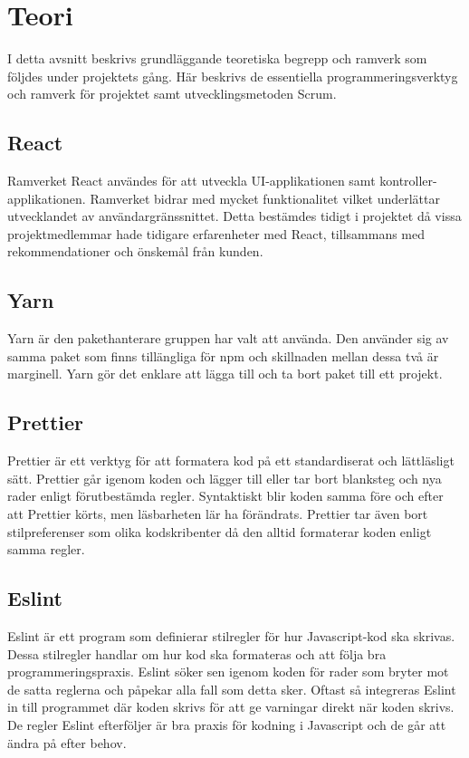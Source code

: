 \chapter{Teori}
\label{cha:theory}
I detta avsnitt beskrivs grundläggande teoretiska begrepp och ramverk som följdes under projektets gång. Här beskrivs de essentiella programmeringsverktyg och ramverk för projektet samt utvecklingsmetoden Scrum.

\section{React}
Ramverket React användes för att utveckla UI-applikationen samt kontroller-applikationen. Ramverket bidrar med mycket funktionalitet vilket underlättar utvecklandet av användargränssnittet.  Detta bestämdes tidigt i projektet då vissa projektmedlemmar hade tidigare erfarenheter med React, tillsammans med rekommendationer och önskemål från kunden. \cite{React}

\section{Yarn}
Yarn är den pakethanterare gruppen har valt att använda. Den använder sig av samma paket som finns tillängliga för npm och skillnaden mellan dessa två är marginell. Yarn gör det enklare att lägga till och ta bort paket till ett projekt. \cite{Yarn}

\section{Prettier}
Prettier är ett verktyg för att formatera kod på ett standardiserat och lättläsligt sätt. Prettier går igenom koden och lägger till eller tar bort blanksteg och nya rader enligt förutbestämda regler. Syntaktiskt blir koden samma före och efter att Prettier körts, men läsbarheten lär ha förändrats. Prettier tar även bort stilpreferenser som olika kodskribenter då den alltid formaterar koden enligt samma regler. \cite{prettier}


\section{Eslint}
Eslint är ett program som definierar stilregler för hur Javascript-kod ska skrivas. Dessa stilregler handlar om hur kod ska formateras och att följa bra programmeringspraxis. Eslint söker sen igenom koden för rader som bryter mot de satta reglerna och påpekar alla fall som detta sker. Oftast så integreras Eslint in till programmet där koden skrivs för att ge varningar direkt när koden skrivs. De regler Eslint efterföljer är bra praxis för kodning i Javascript och de går att ändra på efter behov. \cite{eslint}


